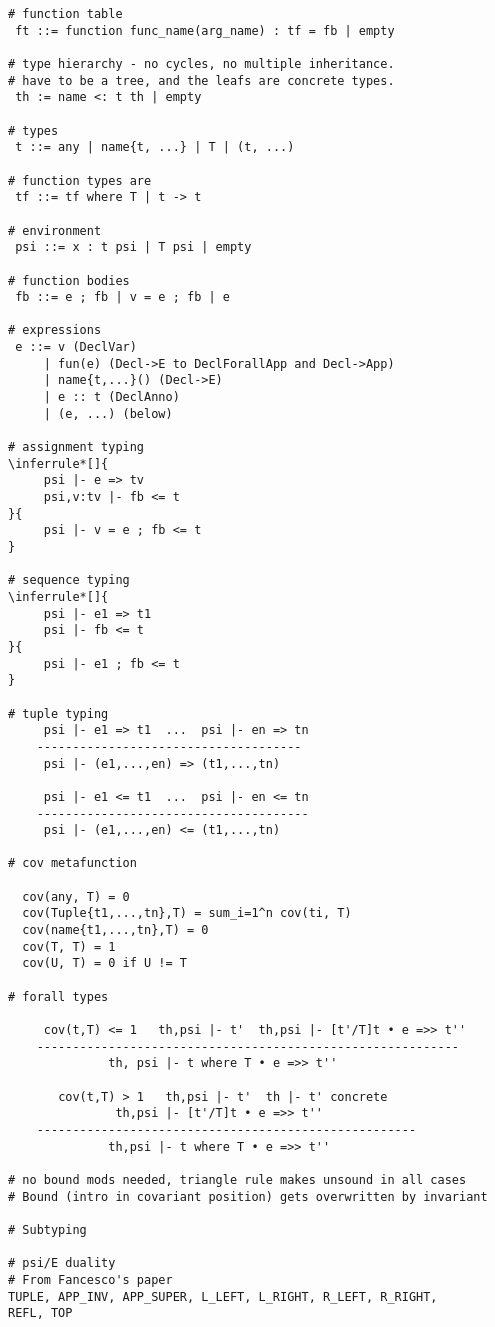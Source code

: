 \documentclass{report} %
\begin{document}
\begin{verbatim}
# function table
 ft ::= function func_name(arg_name) : tf = fb | empty

# type hierarchy - no cycles, no multiple inheritance. 
# have to be a tree, and the leafs are concrete types.
 th := name <: t th | empty

# types
 t ::= any | name{t, ...} | T | (t, ...)

# function types are
 tf ::= tf where T | t -> t

# environment
 psi ::= x : t psi | T psi | empty

# function bodies
 fb ::= e ; fb | v = e ; fb | e 

# expressions
 e ::= v (DeclVar)
     | fun(e) (Decl->E to DeclForallApp and Decl->App)
     | name{t,...}() (Decl->E)
     | e :: t (DeclAnno)
     | (e, ...) (below)

# assignment typing
\inferrule*[]{
     psi |- e => tv
     psi,v:tv |- fb <= t
}{
     psi |- v = e ; fb <= t
}

# sequence typing
\inferrule*[]{
     psi |- e1 => t1
     psi |- fb <= t
}{
     psi |- e1 ; fb <= t
}

# tuple typing
     psi |- e1 => t1  ...  psi |- en => tn
    -------------------------------------
     psi |- (e1,...,en) => (t1,...,tn)

     psi |- e1 <= t1  ...  psi |- en <= tn
    --------------------------------------
     psi |- (e1,...,en) <= (t1,...,tn)

# cov metafunction

  cov(any, T) = 0
  cov(Tuple{t1,...,tn},T) = sum_i=1^n cov(ti, T)
  cov(name{t1,...,tn},T) = 0
  cov(T, T) = 1
  cov(U, T) = 0 if U != T

# forall types

     cov(t,T) <= 1   th,psi |- t'  th,psi |- [t'/T]t • e =>> t''
    -----------------------------------------------------------
              th, psi |- t where T • e =>> t''

       cov(t,T) > 1   th,psi |- t'  th |- t' concrete  
               th,psi |- [t'/T]t • e =>> t''
    -----------------------------------------------------
              th,psi |- t where T • e =>> t''

# no bound mods needed, triangle rule makes unsound in all cases
# Bound (intro in covariant position) gets overwritten by invariant

# Subtyping

# psi/E duality
# From Fancesco's paper
TUPLE, APP_INV, APP_SUPER, L_LEFT, L_RIGHT, R_LEFT, R_RIGHT, 
REFL, TOP


\end{verbatim}
\end{document}
